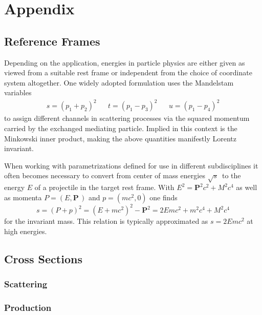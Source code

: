 \chapter*{Appendix}
\label{ch:appendix}

\section{Reference Frames}
\label{sec:frames}

Depending on the application, energies in particle physics are either given as viewed from a suitable rest frame or
independent from the choice of coordinate system altogether. One widely adopted formulation uses the Mandelstam variables
\begin{align*}
	s = (p_1 + p_2)^2 &&
	t = (p_1 - p_3)^2 &&
	u = (p_1 - p_4)^2
\end{align*}
to assign different channels in scattering processes via the squared momentum carried by the exchanged mediating particle.
Implied in this context is the Minkowski inner product, making the above quantities manifestly Lorentz invariant.

When working with parametrizations defined for use in different subdisciplines it often becomes necessary to convert from
center of mass energies $\sqrt{s}\,$ to the energy $E$ of a projectile in the target rest frame. With $E^2 = \bm{P}^2 c^2 + M^2 c^4$
as well as momenta $P = (E, \bm{P}\,)$ and $p = (m c^2 , 0)$ one finds
\begin{equation*}
	s = (P + p)^2 = (E + m c^2)^2 - \bm{P}^2 = 2E m c^2 + m^2 c^4 + M^2 c^4
\end{equation*}
for the invariant mass. This relation is typically approximated as $s = 2E m c^2$ at high energies.


\section{Cross Sections}
\label{sec:cross}

\subsection*{Scattering}

\autocite{Fagundes_2012}

\subsection*{Production}

